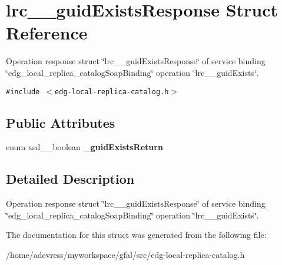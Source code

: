 \section{lrc\_\-\_\-guid\-Exists\-Response Struct Reference}
\label{structlrc____guidExistsResponse}
Operation response struct \char`\"{}lrc\_\-\_\-guid\-Exists\-Response\char`\"{} of service binding \char`\"{}edg\_\-local\_\-replica\_\-catalog\-Soap\-Binding\char`\"{} operation \char`\"{}lrc\_\-\_\-guid\-Exists\char`\"{}.  


{\tt \#include $<$edg-local-replica-catalog.h$>$}

\subsection*{Public Attributes}
\begin{CompactItemize}
\item 
enum xsd\_\-\_\-boolean \textbf{\_\-guid\-Exists\-Return}\label{structlrc____guidExistsResponse_4a1644bc55af9e6052ce61a0213cdca0}

\end{CompactItemize}


\subsection{Detailed Description}
Operation response struct \char`\"{}lrc\_\-\_\-guid\-Exists\-Response\char`\"{} of service binding \char`\"{}edg\_\-local\_\-replica\_\-catalog\-Soap\-Binding\char`\"{} operation \char`\"{}lrc\_\-\_\-guid\-Exists\char`\"{}. 



The documentation for this struct was generated from the following file:\begin{CompactItemize}
\item 
/home/adevress/myworkspace/gfal/src/edg-local-replica-catalog.h\end{CompactItemize}
